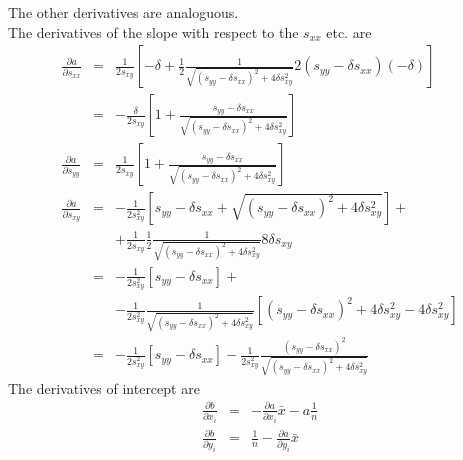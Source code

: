 \documentclass[a4paper,11pt,onepage]{article}
\newcommand{\ddp}[2]{\frac{\partial #1}{\partial #2}}
\begin{document}
The other derivatives are analoguous.\\
The derivatives of the slope with respect to the $s_{xx}$ etc. are 
\begin{eqnarray*}
 \ddp{a}{s_{xx}} &= & \frac1{2s_{xy}} \left[ - \delta +  \frac12 \frac1{\sqrt{( s_{yy} - \delta s_{xx})^2 + 4 \delta s_{xy}^2}} 2 (s_{yy}-\delta s_{xx}) (-\delta)\right] \\
     &=& -\frac\delta{2s_{xy}} \left[ 1 + \frac{s_{yy}- \delta s_{xx}}{\sqrt{( s_{yy} -\delta s_{xx})^2 + 4 \delta s_{xy}^2}} \right] \\
 \ddp{a}{s_{yy}} &=& \frac1{2s_{xy}} \left[ 1 + \frac{s_{yy}- \delta s_{xx}}{\sqrt{( s_{yy} - \delta s_{xx})^2 + 4 \delta s_{xy}^2}} \right] \\
 \ddp{a}{s_{xy}} &=& -\frac1{2s_{xy}^2} \left[ s_{yy}- \delta s_{xx} + \sqrt{ ( s_{yy} - \delta s_{xx})^2 + 4 \delta s_{xy}^2} \right] + \\
 && + \frac1{2s_{xy}} \frac12 \frac1{\sqrt{ ( s_{yy} - \delta s_{xx})^2 + 4 \delta s_{xy}^2}} 8 \delta s_{xy} \\
 &=&-\frac1{2s_{xy}^2} \left[ s_{yy}- \delta s_{xx} \right] + \\
 &&-\frac1{2s_{xy}^2} \frac1{\sqrt{ ( s_{yy} - \delta s_{xx})^2 + 4 \delta s_{xy}^2}} \left[ ( s_{yy} - \delta s_{xx})^2 + 4 \delta s_{xy}^2 - 4 \delta s_{xy}^2 \right] \\
 &=& -\frac1{2s_{xy}^2} \left[ s_{yy}- \delta s_{xx} \right] -\frac1{2s_{xy}^2} \frac{ ( s_{yy} - \delta s_{xx})^2}{\sqrt{ ( s_{yy} - \delta s_{xx})^2 + 4 \delta s_{xy}^2}} 
\end{eqnarray*}
The derivatives of intercept  are
\begin{eqnarray*}
 \ddp{b}{x_i} &=& - \ddp{a}{x_i} \bar x - a \frac1n \\
 \ddp{b}{y_i} &=& \frac1n - \ddp{a}{y_i} \bar x
\end{eqnarray*}
\end{document}
